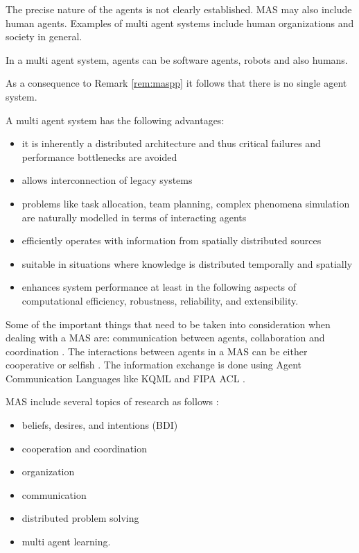 The precise nature of the agents is not clearly established. MAS may also include human agents. Examples of multi agent systems include human organizations and society in general. 

\begin{remark}
\label{rem:maspp}
In a multi agent system, agents can be software agents, robots and also humans.
\end{remark}

\begin{remark}
As a consequence to Remark \ref{rem:maspp} it follows that there is no single agent system.
\end{remark}

A multi agent system has the following advantages:
\begin{itemize}
\item it is inherently a distributed architecture and thus critical failures and performance bottlenecks are avoided
\item allows interconnection of legacy systems
\item problems like task allocation, team planning, complex phenomena simulation are naturally modelled in terms of interacting agents
\item efficiently operates with information from spatially distributed sources
\item suitable in situations where knowledge is distributed temporally and spatially 
\item enhances system performance at least in the following aspects of computational efficiency, robustness, reliability, and extensibility.
\end{itemize}

Some of the important things that need to be taken into consideration when dealing with a MAS are: communication between agents, collaboration and coordination \cite{Serban06Sisteme}. The interactions between agents in a MAS can be either cooperative or selfish \cite{Serban06Sisteme, Wooldridge99Intelligent, Russell02Artificial}. The information exchange is done using Agent Communication Languages like KQML \cite{Finin97Kqml} and FIPA ACL \cite{website:fipa.org}. 


MAS include several topics of research as follows \cite{Serban06Sisteme}:
\begin{itemize}
\item beliefs, desires, and intentions (BDI)
\item cooperation and coordination
\item organization
\item communication
\item distributed problem solving
\item multi agent learning.
\end{itemize}

